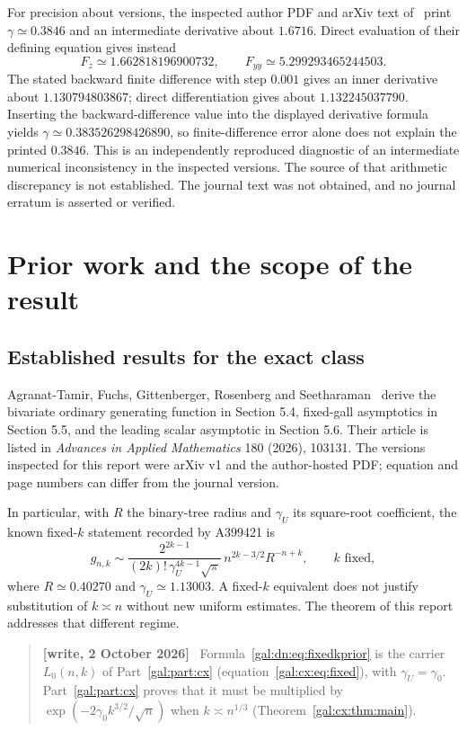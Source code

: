 \documentclass[11pt,letterpaper]{article}
\numberwithin{equation}{section}
\theoremstyle{definition}\newtheorem{definition}[theorem]{Definition}
\theoremstyle{remark}\newtheorem{remark}[theorem]{Remark}
\newenvironment{writenote}{\par\smallskip\begin{quote}\small\textbf{[write, 2 October 2026]}\ }{\end{quote}\smallskip}
\begin{document}
For precision about versions, the inspected author PDF and arXiv text of~\cite{comparison} print $\gamma\simeq0.3846$ and an intermediate derivative about $1.6716$. Direct evaluation of their defining equation gives instead
\[
 F_z\simeq1.662818196900732,\qquad
 F_{yy}\simeq5.299293465244503.
\]
The stated backward finite difference with step $0.001$ gives an inner derivative about $1.130794803867$; direct differentiation gives about $1.132245037790$. Inserting the backward-difference value into the displayed derivative formula yields $\gamma\simeq0.383526298426890$, so finite-difference error alone does not explain the printed $0.3846$. This is an independently reproduced diagnostic of an intermediate numerical inconsistency in the inspected versions. The source of that arithmetic discrepancy is not established. The journal text was not obtained, and no journal erratum is asserted or verified.

\section{Prior work and the scope of the result}\label{gal:dn:sec:prior}
\subsection{Established results for the exact class}
Agranat-Tamir, Fuchs, Gittenberger, Rosenberg and Seetharaman~\cite{comparison} derive the bivariate ordinary generating function in Section 5.4, fixed-gall asymptotics in Section 5.5, and the leading scalar asymptotic in Section 5.6. Their article is listed in \emph{Advances in Applied Mathematics} 180 (2026), 103131. The versions inspected for this report were arXiv v1 and the author-hosted PDF; equation and page numbers can differ from the journal version.

In particular, with $R$ the binary-tree radius and $\gamma_U$ its square-root coefficient, the known fixed-$k$ statement recorded by A399421 is
\begin{equation}\label{gal:dn:eq:fixedkprior}
 g_{n,k}\sim
 \frac{2^{2k-1}}{(2k)!\,\gamma_U^{4k-1}\sqrt\pi}\,
 n^{2k-3/2}R^{-n+k},\qquad k\text{ fixed},
\end{equation}
where $R\simeq0.40270$ and $\gamma_U\simeq1.13003$. A fixed-$k$ equivalent does not justify substitution of $k\asymp n$ without new uniform estimates. The theorem of this report addresses that different regime.
\begin{writenote}
Formula~\eqref{gal:dn:eq:fixedkprior} is the carrier $L_0(n,k)$ of Part~\ref{gal:part:cx} (equation~\eqref{gal:cx:eq:fixed}), with $\gamma_U=\gamma_0$. Part~\ref{gal:part:cx} proves that it must be multiplied by $\exp(-2\gamma_0k^{3/2}/\sqrt n)$ when $k\asymp n^{1/3}$ (Theorem~\ref{gal:cx:thm:main}).
\end{writenote}
\end{document}
